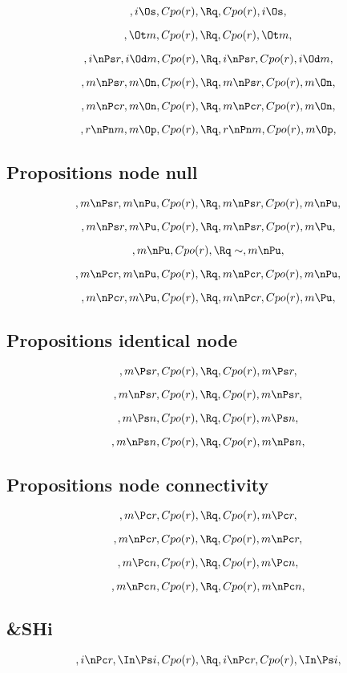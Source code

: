 \[, i \Os, Cpo(r), \Rq , Cpo(r), i \Os, \]

\[, \Ot m, Cpo(r), \Rq , Cpo(r), \Ot m, \]

\[, i \nPs r, i \Od m, Cpo(r), \Rq , i \nPs r, Cpo(r), i \Od m, \]

\[, m \nPs r, m \On, Cpo(r), \Rq , m \nPs r, Cpo(r), m \On, \]

\[, m \nPc r, m \On, Cpo(r), \Rq , m \nPc r, Cpo(r), m \On, \]

\[, r \nPn m, m \Op, Cpo(r), \Rq , r \nPn m,  Cpo(r), m \Op, \]

\bigskip
\bigskip
\subsection{Propositions node null}
\[, m \nPs r, m \nPu, Cpo(r), \Rq, m \nPs r, Cpo(r), m \nPu, \]

\[, m \nPs r, m \Pu, Cpo(r), \Rq, m \nPs r, Cpo(r), m \Pu, \]

\[, m \nPu, Cpo(r), \Rq \sim, m \nPu, \]

\[, m \nPc r, m \nPu, Cpo(r), \Rq,m \nPc r, Cpo(r), m \nPu, \]

\[, m \nPc r, m \Pu, Cpo(r),  \Rq,m \nPc r, Cpo(r), m \Pu, \]


\bigskip
\bigskip
\subsection{Propositions identical node}
\[, m \Ps r, Cpo(r), \Rq , Cpo(r), m \Ps r, \]

\[, m \nPs r, Cpo(r), \Rq , Cpo(r), m \nPs r, \]



\[, m \Ps n, Cpo(r), \Rq , Cpo(r), m \Ps n, \]

\[, m \nPs n, Cpo(r), \Rq , Cpo(r), m \nPs n, \]


\bigskip
\bigskip
\subsection{Propositions  node connectivity}


\[, m \Pc r, Cpo(r), \Rq , Cpo(r), m \Pc r, \]

\[, m \nPc r, Cpo(r), \Rq , Cpo(r), m \nPc r, \]


\[, m \Pc n, Cpo(r), \Rq , Cpo(r), m \Pc n, \]

\[, m \nPc n, Cpo(r), \Rq , Cpo(r), m \nPc n, \]


\bigskip
\bigskip
\subsection{&SHi}
\[, i \nPc r, \In \Ps i, Cpo(r), \Rq , i \nPc r, Cpo(r), \In \Ps i, \]

